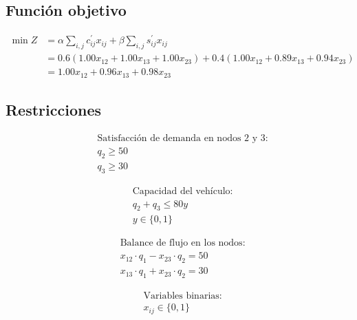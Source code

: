 \documentclass[11pt, a4paper]{article}
\begin{document}
\subsection{Función objetivo}
\begin{align}
\min Z &= \alpha \sum_{i,j} c_{ij}^\prime x_{ij} + \beta \sum_{i,j} s_{ij}^\prime x_{ij} \nonumber \\
&= 0.6 (1.00 x_{12} + 1.00 x_{13} + 1.00 x_{23}) + 0.4 (1.00 x_{12} + 0.89 x_{13} + 0.94 x_{23}) \nonumber \\
&= 1.00 x_{12} + 0.96 x_{13} + 0.98 x_{23}
\end{align}

\subsection{Restricciones}
\begin{align}
& \text{Satisfacción de demanda en nodos 2 y 3:} \nonumber \\
& q_2 \geq 50 \nonumber \\
& q_3 \geq 30 \nonumber
\end{align}

\begin{align}
& \text{Capacidad del vehículo:} \nonumber \\
& q_2 + q_3 \leq 80 y \nonumber \\
& y \in \{0,1\} \nonumber
\end{align}

\begin{align}
& \text{Balance de flujo en los nodos:} \nonumber \\
& x_{12} \cdot q_1 - x_{23} \cdot q_2 = 50 \nonumber \\
& x_{13} \cdot q_1 + x_{23} \cdot q_2 = 30 \nonumber
\end{align}

\begin{align}
& \text{Variables binarias:} \nonumber \\
& x_{ij} \in \{0,1\} \nonumber
\end{align}
\end{document}
